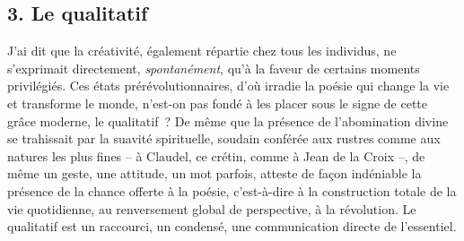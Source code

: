 \documentclass[french,twoside]{book} %
\begin{document}
\subsection[{3. Le qualitatif}]{\textsc{3.} Le qualitatif}
\noindent J’ai dit que la créativité, également répartie chez tous les individus, ne s’exprimait directement, \emph{spontanément}, qu’à la faveur de certains moments privilégiés. Ces états prérévolutionnaires, d’où irradie la poésie qui change la vie et transforme le monde, n’est-on pas fondé à les placer sous le signe de cette grâce moderne, le qualitatif ? De même que la présence de l’abomination divine se trahissait par la suavité spirituelle, soudain conférée aux rustres comme aux natures les plus fines – à Claudel, ce crétin, comme à Jean de la Croix –, de même un geste, une attitude, un mot parfois, atteste de façon indéniable la présence de la chance offerte à la poésie, c’est-à-dire à la construction totale de la vie quotidienne, au renversement global de perspective, à la révolution. Le qualitatif est un raccourci, un condensé, une communication directe de l’essentiel.\par
\end{document}
